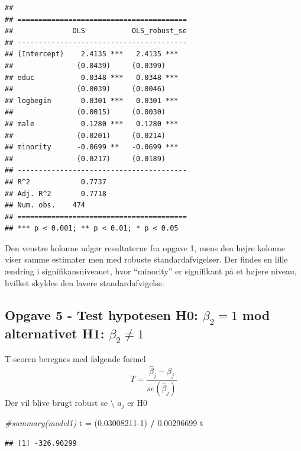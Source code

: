 \documentclass[
]{article}
\newenvironment{Shaded}{\begin{snugshade}}{\end{snugshade}}
\newcommand{\CommentTok}[1]{\textcolor[rgb]{0.56,0.35,0.01}{\textit{#1}}}
\newcommand{\DecValTok}[1]{\textcolor[rgb]{0.00,0.00,0.81}{#1}}
\newcommand{\FloatTok}[1]{\textcolor[rgb]{0.00,0.00,0.81}{#1}}
\newcommand{\NormalTok}[1]{#1}
\newcommand{\OtherTok}[1]{\textcolor[rgb]{0.56,0.35,0.01}{#1}}
\newcommand{\SpecialCharTok}[1]{\textcolor[rgb]{0.81,0.36,0.00}{\textbf{#1}}}
\begin{document}
\begin{verbatim}
## 
## ========================================
##              OLS           OLS_robust_se
## ----------------------------------------
## (Intercept)    2.4135 ***   2.4135 ***  
##               (0.0439)     (0.0399)     
## educ           0.0348 ***   0.0348 ***  
##               (0.0039)     (0.0046)     
## logbegin       0.0301 ***   0.0301 ***  
##               (0.0015)     (0.0030)     
## male           0.1280 ***   0.1280 ***  
##               (0.0201)     (0.0214)     
## minority      -0.0699 **   -0.0699 ***  
##               (0.0217)     (0.0189)     
## ----------------------------------------
## R^2            0.7737                   
## Adj. R^2       0.7718                   
## Num. obs.    474                        
## ========================================
## *** p < 0.001; ** p < 0.01; * p < 0.05
\end{verbatim}

Den venstre kolonne udgør resultaterne fra opgave 1, mens den højre
kolonne viser samme estimater men med robuste standardafvigelser. Der
findes en lille ændring i signifikansniveauet, hvor ``minority'' er
signifikant på et højere niveau, hvilket skyldes den lavere
standardafvigelse.

\hypertarget{opgave-5---test-hypotesen-h0-beta_2-1-mod-alternativet-h1-beta_2-neq-1}{%
\subsection{\texorpdfstring{Opgave 5 - Test hypotesen H0:
\(\beta_2 = 1\) mod alternativet H1:
\(\beta_2 \neq 1\)}{Opgave 5 - Test hypotesen H0: \textbackslash beta\_2 = 1 mod alternativet H1: \textbackslash beta\_2 \textbackslash neq 1}}\label{opgave-5---test-hypotesen-h0-beta_2-1-mod-alternativet-h1-beta_2-neq-1}}

T-scoren beregnes med følgende formel
\[T = \frac{\hat{\beta}_j-\beta_j}{se(\hat{\beta}_j)}\] Der vil blive
brugt robust se \textbackslash{} \(a_j\) er H0

\begin{Shaded}
\begin{Highlighting}[]
\CommentTok{\#summary(model1)}
\NormalTok{t }\OtherTok{=}\NormalTok{ (}\FloatTok{0.03008211}\DecValTok{{-}1}\NormalTok{) }\SpecialCharTok{/} \FloatTok{0.00296699}
\NormalTok{t}
\end{Highlighting}
\end{Shaded}

\begin{verbatim}
## [1] -326.90299
\end{verbatim}
\end{document}
